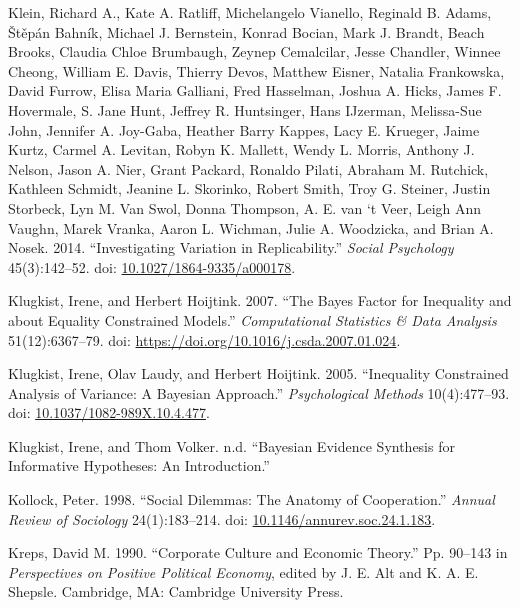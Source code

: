 \documentclass[
  11pt,
]{article}
\newlength{\cslhangindent}
\newlength{\cslentryspacingunit} %
\newenvironment{CSLReferences}[2] %
 {%
  \setlength{\parindent}{0pt}
  \ifodd #1
  \let\oldpar\par
  \def\par{\hangindent=\cslhangindent\oldpar}
  \fi
  \setlength{\parskip}{#2\cslentryspacingunit}
 }%
 {}
\begin{document}
\begin{CSLReferences}{1}{0}
\leavevmode{}%
Klein, Richard A., Kate A. Ratliff, Michelangelo Vianello, Reginald B. Adams, Štěpán Bahník, Michael J. Bernstein, Konrad Bocian, Mark J. Brandt, Beach Brooks, Claudia Chloe Brumbaugh, Zeynep Cemalcilar, Jesse Chandler, Winnee Cheong, William E. Davis, Thierry Devos, Matthew Eisner, Natalia Frankowska, David Furrow, Elisa Maria Galliani, Fred Hasselman, Joshua A. Hicks, James F. Hovermale, S. Jane Hunt, Jeffrey R. Huntsinger, Hans IJzerman, Melissa-Sue John, Jennifer A. Joy-Gaba, Heather Barry Kappes, Lacy E. Krueger, Jaime Kurtz, Carmel A. Levitan, Robyn K. Mallett, Wendy L. Morris, Anthony J. Nelson, Jason A. Nier, Grant Packard, Ronaldo Pilati, Abraham M. Rutchick, Kathleen Schmidt, Jeanine L. Skorinko, Robert Smith, Troy G. Steiner, Justin Storbeck, Lyn M. Van Swol, Donna Thompson, A. E. van `t Veer, Leigh Ann Vaughn, Marek Vranka, Aaron L. Wichman, Julie A. Woodzicka, and Brian A. Nosek. 2014. {``Investigating Variation in Replicability.''} \emph{Social Psychology} 45(3):142--52. doi: \href{https://doi.org/10.1027/1864-9335/a000178}{10.1027/1864-9335/a000178}.

\leavevmode{}%
Klugkist, Irene, and Herbert Hoijtink. 2007. {``The Bayes Factor for Inequality and about Equality Constrained Models.''} \emph{Computational Statistics \& Data Analysis} 51(12):6367--79. doi: \url{https://doi.org/10.1016/j.csda.2007.01.024}.

\leavevmode{}%
Klugkist, Irene, Olav Laudy, and Herbert Hoijtink. 2005. {``Inequality Constrained Analysis of Variance: A Bayesian Approach.''} \emph{Psychological Methods} 10(4):477--93. doi: \href{https://doi.org/10.1037/1082-989X.10.4.477}{10.1037/1082-989X.10.4.477}.

\leavevmode{}%
Klugkist, Irene, and Thom Volker. n.d. {``{B}ayesian {E}vidence {S}ynthesis for Informative Hypotheses: An Introduction.''}

\leavevmode{}%
Kollock, Peter. 1998. {``Social Dilemmas: The Anatomy of Cooperation.''} \emph{Annual Review of Sociology} 24(1):183--214. doi: \href{https://doi.org/10.1146/annurev.soc.24.1.183}{10.1146/annurev.soc.24.1.183}.

\leavevmode{}%
Kreps, David M. 1990. {``Corporate Culture and Economic Theory.''} Pp. 90--143 in \emph{Perspectives on {P}ositive {P}olitical {E}conomy}, edited by J. E. Alt and K. A. E. Shepsle. Cambridge, MA: Cambridge University Press.


\end{CSLReferences}
\end{document}
